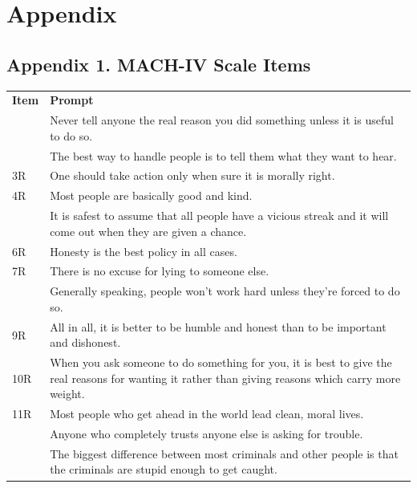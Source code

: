 \documentclass[
]{agujournal2019}
\begin{document}
\section*{Appendix}\label{appendix}

\subsection*{Appendix 1. MACH-IV Scale
Items}\label{appendix-1.-mach-iv-scale-items}

\begin{longtable}[]{@{}
  >{\raggedright\arraybackslash}p{}
  >{\raggedright\arraybackslash}p{}@{}}
\toprule\noalign{}
\endhead
\bottomrule\noalign{}
\endlastfoot
\textbf{Item} & \textbf{Prompt} \\
1 & Never tell anyone the real reason you did something unless it is
useful to do so. \\
2 & The best way to handle people is to tell them what they want to
hear. \\
3R & One should take action only when sure it is morally right. \\
4R & Most people are basically good and kind. \\
5 & It is safest to assume that all people have a vicious streak and it
will come out when they are given a chance. \\
6R & Honesty is the best policy in all cases. \\
7R & There is no excuse for lying to someone else. \\
8 & Generally speaking, people won't work hard unless they're forced to
do so. \\
9R & All in all, it is better to be humble and honest than to be
important and dishonest. \\
10R & When you ask someone to do something for you, it is best to give
the real reasons for wanting it rather than giving reasons which carry
more weight. \\
11R & Most people who get ahead in the world lead clean, moral lives. \\
12 & Anyone who completely trusts anyone else is asking for trouble. \\
13 & The biggest difference between most criminals and other people is
that the criminals are stupid enough to get caught. \\

\end{longtable}
\end{document}
